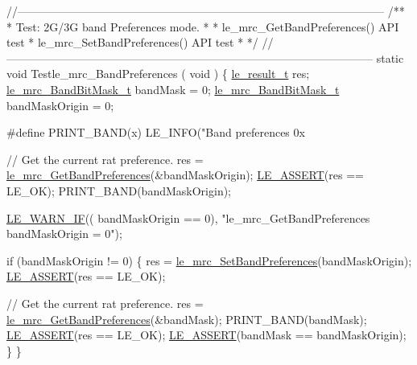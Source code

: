 \begin{DoxyCodeInclude}
\textcolor{comment}{//--------------------------------------------------------------------------------------------------}\textcolor{comment}{}
\textcolor{comment}{/**}
\textcolor{comment}{ * Test: 2G/3G band Preferences mode.}
\textcolor{comment}{ *}
\textcolor{comment}{ * le\_mrc\_GetBandPreferences() API test}
\textcolor{comment}{ * le\_mrc\_SetBandPreferences() API test}
\textcolor{comment}{ *}
\textcolor{comment}{ */}
\textcolor{comment}{//--------------------------------------------------------------------------------------------------}
\textcolor{keyword}{static} \textcolor{keywordtype}{void} Testle\_mrc\_BandPreferences
(
    \textcolor{keywordtype}{void}
)
\{
    \hyperlink{le__basics_8h_a1cca095ed6ebab24b57a636382a6c86c}{le\_result\_t} res;
    \hyperlink{le__mrc__interface_8h_a048374324f72ee7df52c2e0521c0dda3}{le\_mrc\_BandBitMask\_t} bandMask = 0;
    \hyperlink{le__mrc__interface_8h_a048374324f72ee7df52c2e0521c0dda3}{le\_mrc\_BandBitMask\_t} bandMaskOrigin = 0;

\textcolor{preprocessor}{#define  PRINT\_BAND(x)   LE\_INFO("Band preferences 0x%

    \textcolor{comment}{// Get the current rat preference.}
    res = \hyperlink{le__mrc__interface_8h_a04418f56480070ba6c4f3d176dafaa37}{le\_mrc\_GetBandPreferences}(&bandMaskOrigin);
    \hyperlink{le__log_8h_ac0dbbef91dc0fed449d0092ff0557b39}{LE\_ASSERT}(res == LE\_OK);
    PRINT\_BAND(bandMaskOrigin);

    \hyperlink{le__log_8h_a8d8f204806cd5fc0455fe3caacf1d251}{LE\_WARN\_IF}(( bandMaskOrigin == 0), \textcolor{stringliteral}{"le\_mrc\_GetBandPreferences bandMaskOrigin = 0"});

    \textcolor{keywordflow}{if} (bandMaskOrigin != 0)
    \{
        res = \hyperlink{le__mrc__interface_8h_ac808b4dc721e031566da92e00663c027}{le\_mrc\_SetBandPreferences}(bandMaskOrigin);
        \hyperlink{le__log_8h_ac0dbbef91dc0fed449d0092ff0557b39}{LE\_ASSERT}(res == LE\_OK);

        \textcolor{comment}{// Get the current rat preference.}
        res = \hyperlink{le__mrc__interface_8h_a04418f56480070ba6c4f3d176dafaa37}{le\_mrc\_GetBandPreferences}(&bandMask);
        PRINT\_BAND(bandMask);
        \hyperlink{le__log_8h_ac0dbbef91dc0fed449d0092ff0557b39}{LE\_ASSERT}(res == LE\_OK);
        \hyperlink{le__log_8h_ac0dbbef91dc0fed449d0092ff0557b39}{LE\_ASSERT}(bandMask == bandMaskOrigin);
    \}
\}


}
\end{DoxyCodeInclude}
